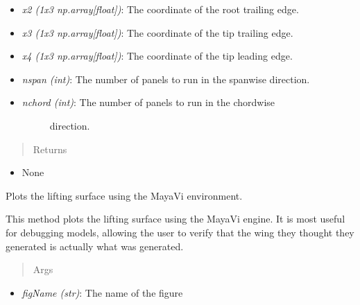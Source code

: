 \documentclass[letterpaper,10pt,english]{sphinxmanual}
\begin{document}
\begin{fulllineitems}
\begin{fulllineitems}
\begin{itemize}
\item {} 
\emph{x2 (1x3 np.array{[}float{]})}: The coordinate of the root trailing edge.

\item {} 
\emph{x3 (1x3 np.array{[}float{]})}: The coordinate of the tip trailing edge.

\item {} 
\emph{x4 (1x3 np.array{[}float{]})}: The coordinate of the tip leading edge.

\item {} 
\emph{nspan (int)}: The number of panels to run in the spanwise direction.

\item {} \begin{description}
\item[{\emph{nchord (int)}: The number of panels to run in the chordwise}] \leavevmode
direction.

\end{description}

\end{itemize}
\begin{quote}\begin{description}
\item[{Returns}] \leavevmode
\end{description}\end{quote}
\begin{itemize}
\item {} 
None

\end{itemize}

\end{fulllineitems}


\begin{fulllineitems}
\label{aerodynamics:AeroComBAT.Aerodynamics.CAERO1.plotLiftingSurface}
Plots the lifting surface using the MayaVi environment.

This method plots the lifting surface using the MayaVi engine. It is
most useful for debugging models, allowing the user to verify that the
wing they thought they generated is actually what was generated.
\begin{quote}\begin{description}
\item[{Args}] \leavevmode
\end{description}\end{quote}
\begin{itemize}
\item {} 
\emph{figName (str)}: The name of the figure


\end{itemize}
\end{fulllineitems}
\end{fulllineitems}
\end{document}
